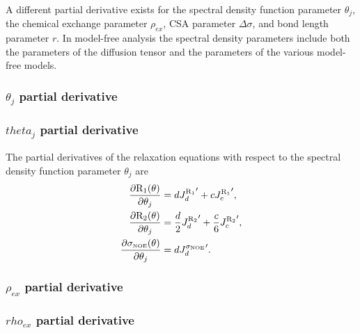 A different partial derivative exists for the spectral density function parameter $\theta_j$, the chemical exchange parameter $\rho_{ex}$, CSA parameter $\Delta\sigma$, and bond length parameter $r$.  In model-free analysis the spectral density parameters include both the parameters of the diffusion tensor and the parameters of the various model-free models.


\begin{latexonly}
    \subsubsection{$\theta_j$ partial derivative}
\end{latexonly}
\begin{htmlonly}
    \subsubsection{$theta_j$ partial derivative}
\end{htmlonly}

The partial derivatives of the relaxation equations with respect to the spectral density function parameter $\theta_j$ are
\begin{subequations}
\begin{align}
    \frac{\partial \mathrm{R}_1(\theta)}{\partial \theta_j} &= d {J_d^{\mathrm{R}_1}}' + c {J_c^{\mathrm{R}_1}}',                      \label{eq: Ri': dR1/dmf} \\
    \frac{\partial \mathrm{R}_2(\theta)}{\partial \theta_j} &= \frac{d}{2} {J_d^{\mathrm{R}_2}}' + \frac{c}{6} {J_c^{\mathrm{R}_2}}',  \label{eq: Ri': dR2/dmf} \\
    \frac{\partial \sigma_{\scriptscriptstyle \mathrm{NOE}}(\theta)}{\partial \theta_j} &= d {J_d^{\sigma_{\scriptscriptstyle \mathrm{NOE}}}}'.                         \label{eq: Ri': dsigmaNOE/dmf}
\end{align}
\end{subequations}


\begin{latexonly}
    \subsubsection{$\rho_{ex}$ partial derivative}
\end{latexonly}
\begin{htmlonly}
    \subsubsection{$rho_{ex}$ partial derivative}
\end{htmlonly}

